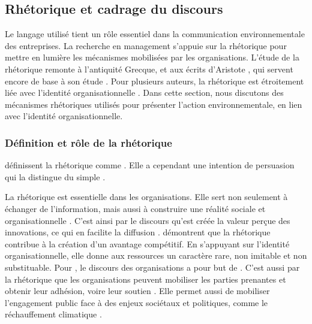     \subsection{Rhétorique et cadrage du discours}

        Le langage utilisé tient un rôle essentiel dans la communication environnementale des entreprises. La recherche en management s'appuie sur la rhétorique pour mettre en lumière les mécanismes mobilisées par les organisations. L'étude de la rhétorique remonte à l'antiquité Grecque, et aux écrits d'Aristote \parencite{aristotle1991rhetorique}, qui servent encore de base à son étude \parencite[par exemple][]{waldron2016how, brennan2014rhetoric, green2004rhetorical}. Pour plusieurs auteurs, la rhétorique est étroitement liée avec l'identité organisationnelle \parencite{sillince2009multiple, waldron2016how, frandsen2011rhetoric}. Dans cette section, nous discutons des mécanismes rhétoriques utilisés pour présenter l'action environnementale, en lien avec l'identité organisationnelle.


        \subsubsection{Définition et rôle de la rhétorique}
           \textcite{brennan2014rhetoric} définissent la rhétorique comme . Elle a cependant une intention de persuasion qui la distingue du simple  \parencite{higgins2012ethos}.

            La rhétorique est essentielle dans les organisations. Elle sert non seulement à échanger de l'information, mais aussi à construire une réalité sociale et organisationnelle \parencite[][]{heracleous2001organizational}. C'est ainsi par le discours qu'est créée la valeur perçue des innovations, ce qui en facilite la diffusion \parencite{green2004rhetorical}. \textcite{sillince2009multiple} démontrent que la rhétorique contribue à la création d'un avantage compétitif. En s'appuyant sur l'identité organisationnelle, elle donne aux ressources un caractère rare, non imitable et non substituable. Pour \textcite{heath2011external}, le discours des organisations a pour but de . C'est aussi par la rhétorique que les organisations peuvent mobiliser les parties prenantes et obtenir leur adhésion, voire leur soutien \parencite{waldron2016how, brennan2014rhetoric}. Elle permet aussi de mobiliser l'engagement public face à des enjeux sociétaux et politiques, comme le réchauffement climatique \parencite{nisbet2009communicating}.

